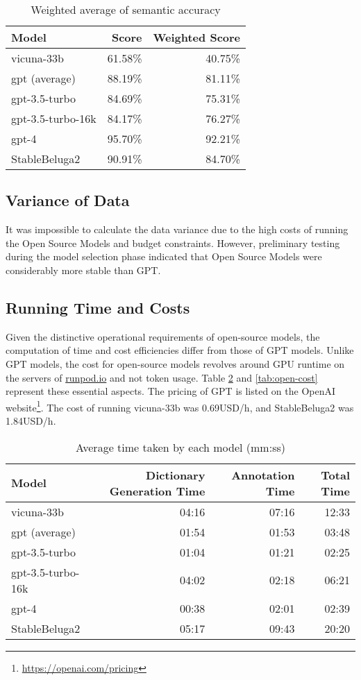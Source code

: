 \begin{table}[htpb]
  \centering
  \begin{tabular}{lrr}
    \hline
    Model & Score & Weighted Score \\
    \hline
    vicuna-33b & 61.58\% & 40.75\% \\
    gpt (average) & 88.19\% & 81.11\% \\
    gpt-3.5-turbo & 84.69\% & 75.31\% \\
    gpt-3.5-turbo-16k & 84.17\% & 76.27\% \\
    gpt-4 & 95.70\% & 92.21\% \\
    StableBeluga2 & 90.91\% & 84.70\% \\
    \hline
  \end{tabular}
  \caption[Semantic Accuracy]{Weighted average of semantic accuracy}
  \label{tab:open-semantic-accuracy}
\end{table}

\subsection{Variance of Data}
It was impossible to calculate the data variance due to the high costs of running the Open Source Models and budget constraints. However, preliminary testing during the model selection phase indicated that Open Source Models were considerably more stable than GPT.

\subsection{Running Time and Costs}
Given the distinctive operational requirements of open-source models, the computation of time and cost efficiencies differ from those of GPT models. Unlike GPT models, the cost for open-source models revolves around GPU runtime on the servers of \href{https://runpod.io}{runpod.io} and not token usage. Table \ref{tab:open-time} and \ref{tab:open-cost} represent these essential aspects. The pricing of GPT is listed on the OpenAI website\footnote{\url{https://openai.com/pricing}}. The cost of running vicuna-33b was 0.69USD/h, and StableBeluga2 was 1.84USD/h.

\begin{table}[htpb]
  \centering
  \begin{tabular}{lrrr}
    \hline
    Model & Dictionary Generation Time & Annotation Time & Total Time \\
    \hline
    vicuna-33b & 04:16 & 07:16 & 12:33 \\
    gpt (average) & 01:54 & 01:53 & 03:48 \\
    gpt-3.5-turbo & 01:04 & 01:21 & 02:25 \\
    gpt-3.5-turbo-16k & 04:02 & 02:18 & 06:21 \\
    gpt-4 & 00:38 & 02:01 & 02:39 \\
    StableBeluga2 & 05:17 & 09:43 & 20:20 \\
    \hline
  \end{tabular}
  \caption[Average time taken]{Average time taken by each model (mm:ss)}
  \label{tab:open-time}
\end{table}

